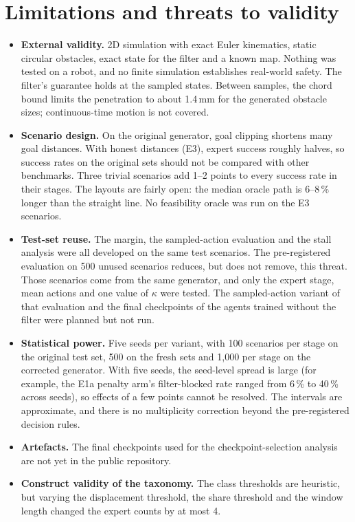 \documentclass[11pt]{article}
\theoremstyle{definition}
\theoremstyle{remark}
\begin{document}
\section{Limitations and threats to validity}\label{sec:limitations}
\begin{itemize}
  \item \textbf{External validity.} 2D simulation with exact Euler kinematics, static circular obstacles, exact state for the filter and a known map. Nothing was tested on a robot, and no finite simulation establishes real-world safety. The filter's guarantee holds at the sampled states. Between samples, the chord bound limits the penetration to about 1.4\,mm for the generated obstacle sizes; continuous-time motion is not covered.
  \item \textbf{Scenario design.} On the original generator, goal clipping shortens many goal distances. With honest distances (E3), expert success roughly halves, so success rates on the original sets should not be compared with other benchmarks. Three trivial scenarios add 1--2 points to every success rate in their stages. The layouts are fairly open: the median oracle path is 6--8\,\% longer than the straight line. No feasibility oracle was run on the E3 scenarios.
  \item \textbf{Test-set reuse.} The margin, the sampled-action evaluation and the stall analysis were all developed on the same test scenarios. The pre-registered evaluation on 500 unused scenarios reduces, but does not remove, this threat. Those scenarios come from the same generator, and only the expert stage, mean actions and one value of $\kappa$ were tested. The sampled-action variant of that evaluation and the final checkpoints of the agents trained without the filter were planned but not run.
  \item \textbf{Statistical power.} Five seeds per variant, with 100 scenarios per stage on the original test set, 500 on the fresh sets and 1{,}000 per stage on the corrected generator. With five seeds, the seed-level spread is large (for example, the E1a penalty arm's filter-blocked rate ranged from 6\,\% to 40\,\% across seeds), so effects of a few points cannot be resolved. The intervals are approximate, and there is no multiplicity correction beyond the pre-registered decision rules.
  \item \textbf{Artefacts.} The final checkpoints used for the checkpoint-selection analysis are not yet in the public repository.
  \item \textbf{Construct validity of the taxonomy.} The class thresholds are heuristic, but varying the displacement threshold, the share threshold and the window length changed the expert counts by at most 4.

\end{itemize}
\end{document}
